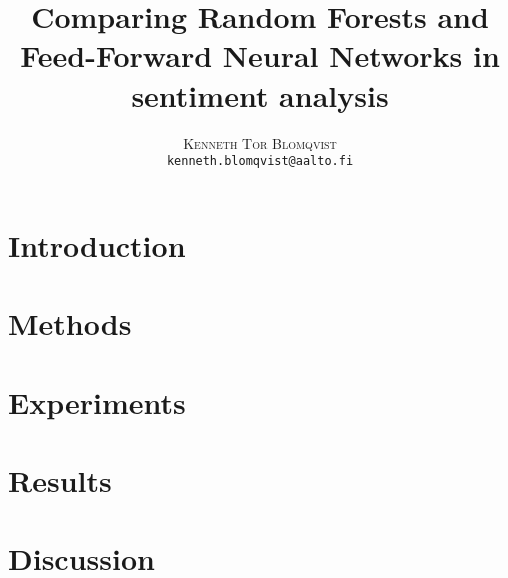 \documentclass[twoside]{article}
\title{\vspace{-15mm}\fontsize{24pt}{10pt}\selectfont\textbf{Comparing Random Forests and Feed-Forward Neural Networks in sentiment analysis}}
\author{
  \large
  \textsc{Kenneth Tor Blomqvist}\\[2mm]
  \tt kenneth.blomqvist@aalto.fi \\[2mm]
}
\date{}
\begin{document}
\maketitle %


\begin{abstract}
  
\end{abstract}


\begin{multicols}{2} %

  \section{Introduction}
  \label{sec:introduction}
  

  \section{Methods}
  \label{sec:methods}
  

  \section{Experiments}
  \label{sec:experiments}
  

  \section{Results}
  \label{sec:results}
  

  \section{Discussion}
  \label{sec:discussion}
  



  
  

\end{multicols} %
\pagebreak
\end{document}
